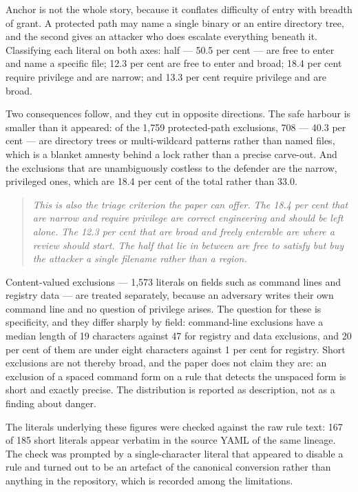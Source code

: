 Anchor is not the whole story, because it conflates difficulty of entry with breadth of grant. A protected path may name a single binary or an entire directory tree, and the second gives an attacker who does escalate everything beneath it. Classifying each literal on both axes: half --- 50.5 per cent --- are free to enter and name a specific file; 12.3 per cent are free to enter and broad; 18.4 per cent require privilege and are narrow; and 13.3 per cent require privilege and are broad.

Two consequences follow, and they cut in opposite directions. The safe harbour is smaller than it appeared: of the 1,759 protected-path exclusions, 708 --- 40.3 per cent --- are directory trees or multi-wildcard patterns rather than named files, which is a blanket amnesty behind a lock rather than a precise carve-out. And the exclusions that are unambiguously costless to the defender are the narrow, privileged ones, which are 18.4 per cent of the total rather than 33.0.

\begin{quote}\itshape
This is also the triage criterion the paper can offer. The 18.4 per cent that are narrow and require privilege are correct engineering and should be left alone. The 12.3 per cent that are broad and freely enterable are where a review should start. The half that lie in between are free to satisfy but buy the attacker a single filename rather than a region.
\end{quote}

Content-valued exclusions --- 1,573 literals on fields such as command lines and registry data --- are treated separately, because an adversary writes their own command line and no question of privilege arises. The question for these is specificity, and they differ sharply by field: command-line exclusions have a median length of 19 characters against 47 for registry and data exclusions, and 20 per cent of them are under eight characters against 1 per cent for registry. Short exclusions are not thereby broad, and the paper does not claim they are: an exclusion of a spaced command form on a rule that detects the unspaced form is short and exactly precise. The distribution is reported as description, not as a finding about danger.

The literals underlying these figures were checked against the raw rule text: 167 of 185 short literals appear verbatim in the source YAML of the same lineage. The check was prompted by a single-character literal that appeared to disable a rule and turned out to be an artefact of the canonical conversion rather than anything in the repository, which is recorded among the limitations.

